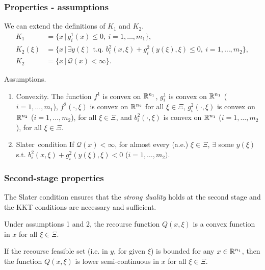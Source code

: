 \documentclass{beamer}
\begin{document}
\begin{frame}
	\frametitle{Properties - assumptions}
	
	We can extend the definitions of $K_1$ and $K_2$.
	\begin{align*}
		K_1 &= \lbrace x \,|\, g_i^1(x) \leq 0,\ i = 1,\ldots,m_1 \rbrace,\\
		K_2(\xi) &= \lbrace x \,|\, \exists y(\xi) \mbox{ t.q. } b_i^2(x,\xi) +
		g_i^2(y(\xi),\xi) \leq 0,\ i = 1,\ldots,m_2 \rbrace,\\
		K_2 &= \lbrace x \,|\, \mathcal{Q}(x) < \infty \rbrace.
	\end{align*}
	
	{\blue Assumptions}.
	\begin{enumerate}
		\item \mbox{\red Convexity}.
		The function $f^1$ is convex on ${\mathbb{R}}^{n_1}$, $g_i^1$ is convex on ${\mathbb{R}}^{n_1}$ ($i =
		1,\ldots,m_1$), $f^2(\cdot,\xi)$ is convex on ${\mathbb{R}}^{n_2}$ for all $\xi \in \Xi$, $g_i^2(\cdot,\xi)$ is convex on ${\mathbb{R}}^{n_2}$ ($i = 1,\ldots,m_2$), for all $\xi \in \Xi$, and $b_i^2(\cdot, \xi)$ is convex on ${\mathbb{R}}^{n_1}$ ($i = 1,\ldots,m_2$), for all $\xi \in \Xi$.
		\item \mbox{\red Slater condition}
		If $\mathcal{Q}(x) < \infty$, for almost every (a.e.) $\xi \in \Xi$, $\exists$ some $y(\xi)$ s.t. $b_i^2(x, \xi) + g_i^2(y(\xi), \xi) < 0$ ($i = 1,\ldots,m_2)$.
	\end{enumerate}
	
\end{frame}

\begin{frame}
\frametitle{Second-stage properties}

The Slater condition ensures that the \textit{strong duality} holds at the second stage and the KKT conditions are necessary and sufficient.

\mbox{}

\begin{theorem}
Under assumptions 1 and 2, the recourse function $Q(x,\xi)$ is a convex function in $x$ for all $\xi \in \Xi$.
\end{theorem}

\begin{theorem}
If the recourse feasible set (i.e. in $y$, for given $\xi$) is bounded for any $x \in {\mathbb{R}}^{n_1}$, then the function $Q(x,\xi)$ is lower semi-continuous in $x$ for all $\xi \in \Xi$.
\end{theorem}

\end{frame}
\end{document}
